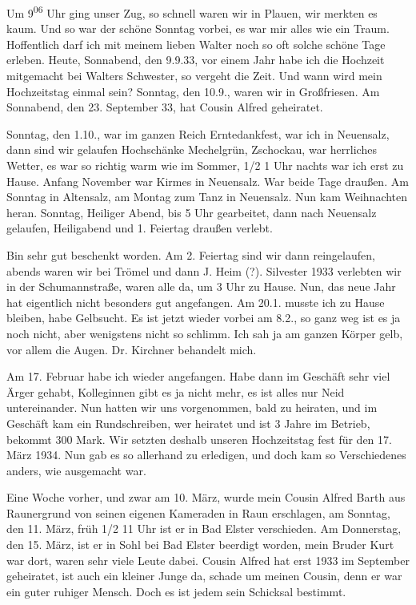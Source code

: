 \documentclass[a5paper,11pt,openany]{book}
\newcommand{\seite}[1]{\leavevmode\marginpar{\footnotesize\itshape\raggedright #1}\ignorespaces}
\newcommand{\jahr}[1]{\par\medskip\noindent{\scshape #1}\par\nopagebreak}
\begin{document}
\seite{25}
Um 9\textsuperscript{06} Uhr ging unser Zug, so schnell waren wir in Plauen, wir merkten es kaum.
Und so war der schöne Sonntag vorbei,
  es war mir alles wie ein Traum.
Hoffentlich darf ich mit meinem lieben Walter noch so oft solche schöne Tage erleben.
Heute, Sonnabend, den 9.9.33, vor einem Jahr habe ich die Hochzeit mitgemacht bei Walters Schwester, so vergeht die Zeit.
Und wann wird mein Hochzeitstag einmal sein?
Sonntag, den 10.9., waren wir in Großfriesen.
Am Sonnabend, den 23. September 33, hat Cousin Alfred geheiratet.

\seite{26}
Sonntag, den 1.10., war im ganzen Reich Erntedankfest, war ich in Neuensalz,
  dann sind wir gelaufen Hochschänke Mechelgrün, Zschockau, war herrliches Wetter,
  es war so richtig warm wie im Sommer, 1/2 1 Uhr nachts war ich erst zu Hause.
Anfang November war Kirmes in Neuensalz.
War beide Tage draußen.
Am Sonntag in Altensalz, am Montag zum Tanz in Neuensalz.
Nun kam Weihnachten heran.
Sonntag, Heiliger Abend, bis 5 Uhr gearbeitet, dann nach Neuensalz gelaufen, Heiligabend und 1. Feiertag draußen verlebt.

\jahr{1934.}
\seite{27}
Bin sehr gut beschenkt worden.
Am 2. Feiertag sind wir dann reingelaufen, abends waren wir bei Trömel und dann J. Heim (?).
Silvester 1933 verlebten wir in der Schumannstraße,
  waren alle da, um 3 Uhr zu Hause.
Nun, das neue Jahr hat eigentlich nicht besonders gut angefangen.
Am 20.1. musste ich zu Hause bleiben,
  habe Gelbsucht.
Es ist jetzt wieder vorbei am 8.2.,
  so ganz weg ist es ja noch nicht, aber wenigstens nicht so schlimm.
Ich sah ja am ganzen Körper gelb, vor allem die Augen.
Dr. Kirchner behandelt mich.

\seite{28}
Am 17. Februar habe ich wieder angefangen.
Habe dann im Geschäft sehr viel Ärger gehabt, Kolleginnen gibt es ja nicht mehr, es ist alles nur Neid untereinander.
Nun hatten wir uns vorgenommen, bald zu heiraten,
  und im Geschäft kam ein Rundschreiben, wer heiratet und ist 3 Jahre im Betrieb, bekommt 300 Mark.
Wir setzten deshalb unseren Hochzeitstag fest für den 17. März 1934.
Nun gab es so allerhand zu erledigen, und doch kam so Verschiedenes anders, wie ausgemacht war.

\seite{29}
Eine Woche vorher, und zwar am 10. März, wurde mein Cousin Alfred Barth aus Raunergrund von seinen eigenen Kameraden in Raun erschlagen,
  am Sonntag, den 11. März, früh 1/2 11 Uhr ist er in Bad Elster verschieden.
Am Donnerstag, den 15. März, ist er in Sohl bei Bad Elster beerdigt worden, mein Bruder Kurt war dort, waren sehr viele Leute dabei.
Cousin Alfred hat erst 1933 im September geheiratet,
  ist auch ein kleiner Junge da, schade um meinen Cousin, denn er war ein guter ruhiger Mensch.
Doch es ist jedem sein Schicksal bestimmt.
\end{document}
